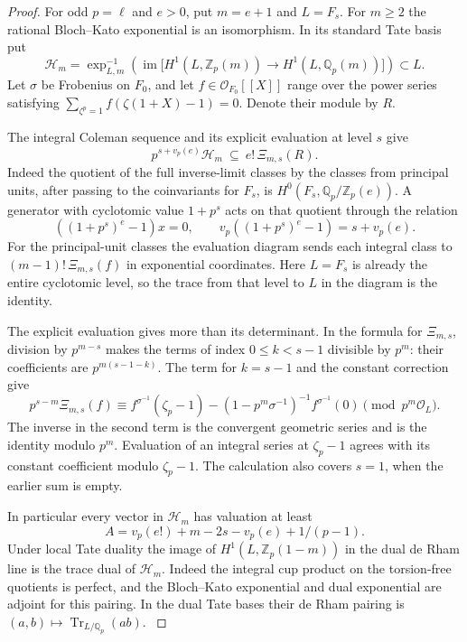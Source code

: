 \begin{proof}
For odd \(p=\ell\) and \(e>0\), put \(m=e+1\) and \(L=F_s\). For \(m\ge2\) the rational Bloch--Kato exponential is an isomorphism. In its standard Tate basis put
\[
 \mathcal H_m=\exp_{L,m}^{-1}\!\left(\operatorname{im}\big[H^1(L,\mathbb Z_p(m))
                           \longrightarrow H^1(L,\mathbb Q_p(m))\big]\right)\subset L .
\] Let \(\sigma\) be Frobenius on \(F_0\), and let \(f\in\mathcal O_{F_0}[[X]]\) range over the power series satisfying \(\sum_{\zeta^p=1}f(\zeta(1+X)-1)=0\). Denote their module by \(R\).

The integral Coleman sequence and its explicit evaluation at level \(s\) give
\[
          p^{s+v_p(e)}\mathcal H_m\ \subseteq\ e!\,\Xi_{m,s}(R).
\]
Indeed the quotient of the full inverse-limit classes by the classes from principal units, after passing to the coinvariants for \(F_s\), is \(H^0(F_s,\mathbb Q_p/\mathbb Z_p(e))\). A generator with cyclotomic value \(1+p^s\) acts on that quotient through the relation
\[
       ((1+p^s)^e-1)x=0,\qquad v_p((1+p^s)^e-1)=s+v_p(e).
\] For the principal-unit classes the evaluation diagram sends each integral class to \((m-1)!\,\Xi_{m,s}(f)\) in exponential coordinates. Here \(L=F_s\) is already the entire cyclotomic level, so the trace from that level to \(L\) in the diagram is the identity. \cite[Sections~2.3.1--2.3.2, (4)--(5)]{benois-nguyen-tamagawa}

The explicit evaluation gives more than its determinant. In the formula for \(\Xi_{m,s}\), division by \(p^{m-s}\) makes the terms of index \(0\le k<s-1\) divisible by \(p^m\): their coefficients are \(p^{m(s-1-k)}\). The term for \(k=s-1\) and the constant correction give
\[
 p^{s-m}\Xi_{m,s}(f)\equiv
 f^{\sigma^{-1}}(\zeta_p-1)-(1-p^m\sigma^{-1})^{-1}f^{\sigma^{-1}}(0)
                      \pmod{p^m\mathcal O_L}.
\]
The inverse in the second term is the convergent geometric series and is the identity modulo \(p^m\). Evaluation of an integral series at \(\zeta_p-1\) agrees with its constant coefficient modulo \(\zeta_p-1\). The calculation also covers \(s=1\), when the earlier sum is empty. \cite[Section~2.2.1, definition of \(\Xi_{m,n}\)]{benois-nguyen-tamagawa}

In particular every vector in \(\mathcal H_m\) has valuation at least
\[
 A=v_p(e!)+m-2s-v_p(e)+1/(p-1).
\]
Under local Tate duality the image of \(H^1(L,\mathbb Z_p(1-m))\) in the dual de Rham line is the trace dual of \(\mathcal H_m\). Indeed the integral cup product on the torsion-free quotients is perfect, and the Bloch--Kato exponential and dual exponential are adjoint for this pairing. In the dual Tate bases their de Rham pairing is \((a,b)\mapsto\operatorname{Tr}_{L/\mathbb Q_p}(ab)\). \cite[Section~3]{bloch-kato-finite}


\end{proof}
